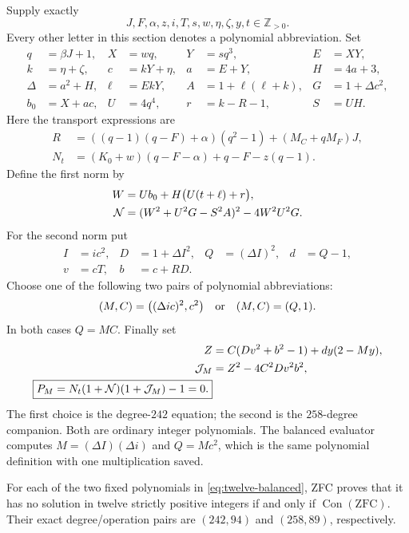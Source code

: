 Supply exactly
\[
 J,F,\alpha,z,i,T,s,w,\eta,\zeta,y,t\in\mathbb Z_{>0}.
\]
Every other letter in this section denotes a polynomial abbreviation.  Set
\begin{align*}
 q&=\beta J+1,&X&=wq,&Y&=sq^3,&E&=XY,\\
 k&=\eta+\zeta,&c&=kY+\eta,&a&=E+Y,&H&=4a+3,\\
 \Delta&=a^2+H,&\ell&=EkY,&A&=1+\ell(\ell+k),&G&=1+\Delta c^2,\\
 b_0&=X+ac,&U&=4q^4,&r&=k-R-1,&S&=UH.
\end{align*}
Here the transport expressions are
\begin{align*}
 R&=((q-1)(q-F)+\alpha)(q^2-1)+(M_C+qM_F)J,\\
 N_t&=(K_0+w)(q-F-\alpha)+q-F-z(q-1).
\end{align*}
Define the first norm by
\begin{align}
 W&=Ub_0+H\bigl(U(t+\ell)+r\bigr),\notag\\
 \mathcal N&=(W^2+U^2G-S^2A)^2-4W^2U^2G.
 \label{eq:two-root-norm}
\end{align}
For the second norm put
\begin{align*}
 I&=ic^2,&D&=1+\Delta I^2,&Q&=(\Delta I)^2,&d&=Q-1,\\
 v&=cT,&b&=c+RD.
\end{align*}
Choose one of the following two pairs of polynomial abbreviations:
\[
 (M,C)=\bigl((\Delta ic)^2,c^2\bigr)
 \quad\hbox{or}\quad
 (M,C)=(Q,1).
\]
In both cases $Q=MC$.  Finally set
\begin{align}
 Z&=C(Dv^2+b^2-1)+dy(2-My),\notag\\
 \mathcal J_M&=Z^2-4C^2Dv^2b^2,\notag\\
 \boxed{P_M=N_t(1+\mathcal N)(1+\mathcal J_M)-1=0.}
 \label{eq:twelve-balanced}
\end{align}
The first choice is the degree-$242$ equation; the second is the
$258$-degree companion.  Both are ordinary integer polynomials.  The
balanced evaluator computes $M=(\Delta I)(\Delta i)$ and $Q=Mc^2$,
which is the same polynomial definition with one multiplication saved.

\begin{theorem}
For each of the two fixed polynomials in \eqref{eq:twelve-balanced}, ZFC
proves that it has no solution in twelve strictly positive integers if and
only if $\operatorname{Con}(\mathrm{ZFC})$.  Their exact degree/operation
pairs are $(242,94)$ and $(258,89)$, respectively.
\end{theorem}

